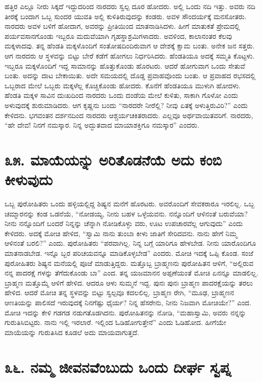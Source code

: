 ಹತ್ತಿರ ಎಲ್ಲೂ ನೀರು ಸಿಕ್ಕದೆ ಇದ್ದುದರಿಂದ ನಾರದರು ಸ್ವಲ್ಪ ದೂರ ಹೋದರು. ಅಲ್ಲಿ ಒಂದು ನದಿ ಇತ್ತು. ಅವರು ನದಿ ತೀರಕ್ಕೆ ಬಂದಾಗ ಒಬ್ಬ ಸುಂದರ ಯುವತಿ ಅಲ್ಲಿ ಕುಳಿತಿರುವುದನ್ನು ಕಂಡರು. ಅವಳ ಸೌಂದರ್ಯಕ್ಕೆ ಮನಸೋತರು. ನಾರದರು ಅವಳ ಬಳಿಗೆ ಹೋದಾಗ, ಅವರನ್ನು ಪ್ರೀತಿಯಿಂದ ಮಾತನಾಡಿಸಿದಳು. ಹೀಗೆ ಮಾತುಕತೆ ಪ್ರೇಮದಲ್ಲಿ ಪರ್ಯವಸಾನಗೊಂಡು ಇಬ್ಬರೂ ಮದುವೆಯಾಗಿ ಗೃಹಸ್ಥಾಶ್ರಮಿಗಳಾದರು. ಅವಳಿಂದ, ಕಾಲಾನಂತರ ಕೆಲವು ಮಕ್ಕಳಾದವು. ತನ್ನ ಹೆಂಡತಿ ಮಕ್ಕಳೊಂದಿಗೆ ಸಂತೋಷದಿಂದಿರುವಾಗ ಆ ದೇಶಕ್ಕೆ ಕ್ಷಾಮ ಬಂತು. ಅನೇಕ ಜನ ಸತ್ತರು. ಆಗ ನಾರದರು ಆ ಸ್ಥಳವನ್ನು ಬಿಟ್ಟು ಬೇರೆ ಕಡೆಗೆ ಹೋಗಲು ನಿರ್ಧರಿಸಿದರು. ಹೆಂಡತಿಯೂ ಅದಕ್ಕೆ ಸಮ್ಮತಿ ಕೊಟ್ಟಳು. ಇಬ್ಬರೂ ಮಕ್ಕಳೊಂದಿಗೆ ಇದ್ದ ಸಾಮಾನನ್ನು ಹೊತ್ತುಕೊಂಡು ಹೊರಟರು. ಆದರೆ ಹೋಗುವಾಗ ಒಂದು ಸೇತುವೆ ಬಂತು. ಅದನ್ನು ದಾಟ ಬೇಕಾಯಿತು. ಅದೇ ಸಮಯದಲ್ಲಿ ದೊಡ್ಡ ಪ್ರವಾಹವೊಂದು ಬಂತು. ಆ ಪ್ರವಾಹದ ರಭಸದಲ್ಲಿ ಒಬ್ಬರಾದ ಮೇಲೆ ಒಬ್ಬರು ಮಕ್ಕಳೆಲ್ಲ ಕೊಚ್ಚಿಕೊಂಡು ಹೋದರು. ಕೊನೆಗೆ ಹೆಂಡತಿಯೂ ಮುಳುಗಿ ಹೋದಳು. ಹೆಂಡತಿ ಮಕ್ಕಳ ಸಾವಿನ ದುಃಖದಿಂದ ನಾರದರು ಒಂದು ದಂಡೆಯ ಮೇಲೆ ಕುಳಿತು, ಸಾಕಾಗಿ ಗೊಳೋ ಎಂದು ಅಳುವುದಕ್ಕೆ ಶುರುಮಾಡಿದರು. ಆಗ ಕೃಷ್ಣನು ಬಂದು “ನಾರದರೇ ನೀರೆಲ್ಲಿ? ನೀವು ಏತಕ್ಕೆ ಅಳುತ್ತಿರುವಿರಿ?” ಎಂದು ಕೇಳಿದನು. ಭಗವಂತನ ದರ್ಶನದಿಂದ ನಾರದರು ಆಶ್ಚರ್ಯಚಕಿತರಾದರು. ಎಲ್ಲವೂ ಅರ್ಥವಾಯಿತವರಿಗೆ. ನಾರದರು, “ಹೇ ದೇವ! ನಿನಗೆ ನಮಸ್ಕಾರ. ನಿನ್ನ ಅದ್ಭುತವಾದ ಮಾಯಾಶಕ್ತಿಗೂ ನಮಸ್ಕಾರ” ಎಂದರು.


\section{\num{೩೫. } ಮಾಯೆಯನ್ನು ಅರಿತೊಡನೆಯೆ ಅದು ಕಂಬಿ ಕೀಳುವುದು}

ಒಬ್ಬ ಪುರೋಹಿತರು ಒಂದು ಹಳ್ಳಿಯಲ್ಲಿದ್ದ ಶಿಷ್ಯನ ಮನೆಗೆ ಹೊರಟರು. ಅವರೊಂದಿಗೆ ಸೇವಕರಾರೂ ಇರಲಿಲ್ಲ. ಒಬ್ಬ ಚಮ್ಮಾರನನ್ನು ಕಂಡ ಒಡನೆಯೆ, “ನೋಡಯ್ಯ, ನೀನು ಬಹಳ ಒಳ್ಳೆಯವನು. ನನ್ನೊಂದಿಗೆ ಆಳಿನಂತೆ ಬರುವೆಯಾ? ನೀನು ನನ್ನೊಂದಿಗೆ ಬಂದರೆ ನಿನ್ನನ್ನು ಚೆನ್ನಾಗಿ ನೋಡಿಕೊಳ್ಳು ವರು, ಊಟ ಉಪಚಾರವೆಲ್ಲ ಆಗುವುದು” ಎಂದು ಕೇಳಿದರು. ಅದಕ್ಕೆ ಮೋಚಿ ಹೇಳಿದ, “ಸ್ವಾಮಿ ನಾನು ತುಂಬಾ ಕೀಳು ಜಾತಿಗೆ ಸೇರಿದವನು. ನಾನು ಹೇಗೆ ನಿಮ್ಮ ಆಳಿನಂತೆ ಬರಲಿ?” ಎಂದು. ಪುರೋಹಿತರು “ಪರವಾಗಿಲ್ಲ. ನಿನ್ನ ಬಗ್ಗೆ ಯಾರಿಗೂ ಹೇಳಬೇಡ. ನೀನು ಯಾರೊಂದಿಗೂ ಮಾತನಾಡಬೇಡ. ಇನ್ನೊ ಬ್ಬರ ಪರಿಚಯವನ್ನೂ ಮಾಡಿಕೊಳ್ಳಬೇಡ” ಎಂದರು. ಮೋಚಿ ಇದಕ್ಕೆ ಒಪ್ಪಿ ಕೊಂಡ. ಸಂಜೆ ಪುರೋಹಿತರು ಶಿಷ್ಯನ ಮನೆಯಲ್ಲಿ ಪೂಜೆ ಮಾಡುತ್ತಿದ್ದರು. ಮತ್ತೊಬ್ಬ ಬ್ರಾಹ್ಮಣನು ಪುರೋಹಿತನ ಆಳಿಗೆ, “ಅಲ್ಲಿರುವ ನನ್ನ ಪಾದರಕ್ಷೆ ಗಳನ್ನು ತೆಗೆದುಕೊಂಡು ಬಾ” ಎಂದ. ತನ್ನ ಯಜಮಾನನ ಅಪ್ಪಣೆಯಂತೆ ಮೋಚಿ ಏನನ್ನೂ ಮಾಡಲಿಲ್ಲ. ಬ್ರಾಹ್ಮಣ ಮತ್ತೊಮ್ಮೆ ಆಳಿಗೆ ಹೇಳಿದ. ಆದರೂ ಆಳು ಸುಮ್ಮನೆ ಇದ್ದ. ಪುನಃ ಪುನಃ ಬ್ರಾಹ್ಮಣ ಪಾದರಕ್ಷೆಯನ್ನು ತರಲು ಹೇಳಿದ. ಆದರೆ ಮೋಚಿ ತನ್ನ ಸ್ಥಳವನ್ನು ಬಿಟ್ಟು ಸ್ವಲ್ಪವೂ ಕದಲಲಿಲ್ಲ. ಬ್ರಾಹ್ಮಣ ರೇಗಿ, “ಮೂಢ, ಬ್ರಾಹ್ಮಣನ ಆಣತಿಯನ್ನು ಪಾಲಿಸದೆ ಇರುವುದಕ್ಕೆ ನಿನಗೆಷ್ಟು ಧೈರ್ಯ? ನಿನ್ನ ಹೆಸರೇನು, ನೀನು ನಿಜವಾಗಿ ಮೋಚಿಯೇ?” ಎಂದ. ಮೋಚಿ ಇದನ್ನು ಕೇಳಿ ಗಡಗಡ ನಡುಗತೊಡಗಿದನು. ಪುರೋಹಿತನನ್ನು ನೋಡಿ, “ಮಹಾಸ್ವಾಮಿ, ಅವರು ನನ್ನನ್ನು ಗುರುತಿಸಿಬಿಟ್ಟರು. ನಾನು ಇಲ್ಲಿ ಇರಲಾರೆ. ಇಲ್ಲಿಂದ ಓಡಿಹೋಗುತ್ತೇನೆ” ಎಂದು ಓಡಿಹೋದ. ಹೀಗೆಯೇ ಮಾಯೆಯನ್ನು ಗುರುತಿಸಿದ ಕೂಡಲೆ ಅದು ಮಾಯವಾಗುತ್ತದೆ.


\section{\num{೩೬. } ನಮ್ಮ ಜೀವನವೆಂಬುದು ಒಂದು ದೀರ್ಘ ಸ್ವಪ್ನ}

